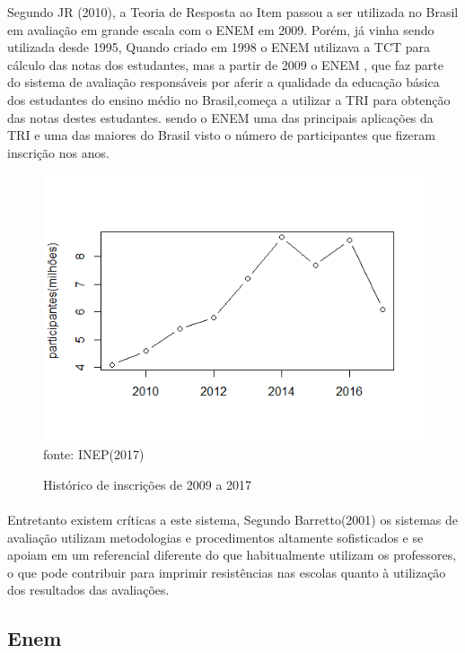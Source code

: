     \par
    	Segundo JR (2010), a Teoria de Resposta ao Item passou a ser utilizada no Brasil em avaliação em grande escala com o ENEM em 2009. Porém, já vinha sendo utilizada desde 1995, Quando criado em 1998 o ENEM utilizava a TCT para cálculo das notas dos estudantes, mas a partir de 2009 o ENEM , que faz parte do sistema de avaliação responsáveis por aferir a qualidade da educação básica dos estudantes do ensino médio no Brasil,começa a utilizar a TRI para obtenção das notas destes estudantes. sendo o ENEM uma das principais aplicações da TRI e uma das maiores do Brasil visto o número de participantes que fizeram inscrição nos anos.
    \begin{figure}[!h]
		\centering
		\caption{Histórico de inscrições de 2009 a 2017}
		\includegraphics[width=0.5\linewidth]{img/parci}\\
		fonte: INEP(2017)
		\label{fig:parci}
	\end{figure}
    \paragraph{}
    	Entretanto existem críticas a este sistema, Segundo Barretto(2001) os sistemas de avaliação utilizam metodologias e procedimentos altamente sofisticados e se apoiam em um referencial diferente do que habitualmente utilizam os professores, o que pode contribuir para imprimir resistências nas escolas quanto à utilização dos resultados das avaliações.
    \subsection{Enem}
